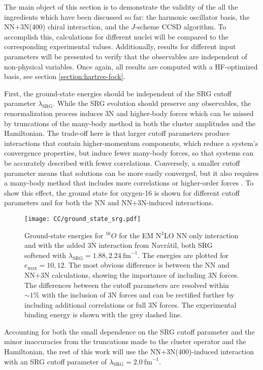 \documentclass[thesis.tex]{subfiles}
\begin{document}
The main object of this section is to demonstrate the validity of the all the ingredients which have been discussed so far: the harmonic oscillator basis, the NN+3N(400) chiral interaction, and the $J$-scheme CCSD algorithm.  To accomplish this, calculations for different nuclei will be compared to the corresponding experimental values.  Additionally, results for different input parameters will be presented to verify that the observables are independent of non-physical variables.  Once again, all results are computed with a HF-optimized basis, see section \ref{section:hartree-fock}.

First, the ground-state energies should be independent of the SRG cutoff parameter $\lambda_{\mathrm{SRG}}$.  While the SRG evolution should preserve any observables, the renormalization process induces 3N and higher-body forces which can be missed by truncations of the many-body method in both the cluster amplitudes and the Hamiltonian.  The trade-off here is that larger cutoff parameters produce interactions that contain higher-momentum components, which reduce a system's convergence properties, but induce fewer many-body forces, so that systems can be accurately described with fewer correlations.  Conversely, a smaller cutoff parameter means that solutions can be more easily converged, but it also requires a many-body method that includes more correlations or higher-order forces \cite{ROTH2012}.  To show this effect, the ground state for oxygen-16 is shown for different cutoff parameters and for both the NN and NN+3N-induced interactions.  
\begin{figure}[h!]
  \centering
  \texttt{[image: CC/ground\_state\_srg.pdf]}
  \caption{Ground-state energies for ${}^{16}O$ for the EM N$^{3}$LO NN only interaction and with the added 3N interaction from Navr\'{a}til, both SRG softened with $\lambda_{\mathrm{SRG}}=1.88,2.24\ \mathrm{fm}^{-1}$.  The energies are plotted for $e_\mathrm{max}=10,12$.  The most obvious difference is between the NN and NN+3N calculations, showing the importance of including 3N forces.  The differences between the cutoff parameters are resolved within $\sim 1\%$ with the inclusion of 3N forces and can be rectified further by including additional correlations or full 3N forces.  The experimental binding energy is shown with the grey dashed line.}
  \label{fig:Ground_State_srg}
\end{figure}
Accounting for both the small dependence on the SRG cutoff parameter and the minor inaccuracies from the truncations made to the cluster operator and the Hamiltonian, the rest of this work will use the NN+3N(400)-induced interaction with an SRG cutoff parameter of $\lambda_{\mathrm{SRG}}=2.0\ \mathrm{fm}^{-1}$.
\end{document}
